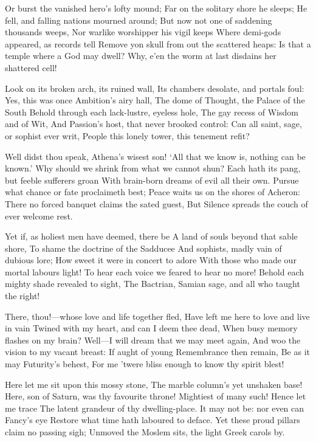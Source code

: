 \documentclass[10pt,twocolumn]{book}
\begin{document}
   Or burst the vanished hero's lofty mound;
   Far on the solitary shore he sleeps;
   He fell, and falling nations mourned around;
   But now not one of saddening thousands weeps,
   Nor warlike worshipper his vigil keeps
   Where demi-gods appeared, as records tell
   Remove yon skull from out the scattered heaps:
   Is that a temple where a God may dwell?
Why, e'en the worm at last disdains her shattered cell!


   Look on its broken arch, its ruined wall,
   Its chambers desolate, and portals foul:
   Yes, this was once Ambition's airy hall,
   The dome of Thought, the Palace of the South
   Behold through each lack-lustre, eyeless hole,
   The gay recess of Wisdom and of Wit,
   And Passion's host, that never brooked control:
   Can all saint, sage, or sophist ever writ,
People this lonely tower, this tenement refit?


   Well didst thou speak, Athena's wisest son!
   `All that we know is, nothing can be known.'
   Why should we shrink from what we cannot shun?
   Each hath its pang, but feeble sufferers groan
   With brain-born dreams of evil all their own.
   Pursue what chance or fate proclaimeth best;
   Peace waits us on the shores of Acheron:
   There no forced banquet claims the sated guest,
But Silence spreads the couch of ever welcome rest.


   Yet if, as holiest men have deemed, there be
   A land of souls beyond that sable shore,
   To shame the doctrine of the Sadducee
   And sophists, madly vain of dubious lore;
   How sweet it were in concert to adore
   With those who made our mortal labours light!
   To hear each voice we feared to hear no more!
   Behold each mighty shade revealed to sight,
The Bactrian, Samian sage, and all who taught the right!


   There, thou!---whose love and life together fled,
   Have left me here to love and live in vain\textemdash
   Twined with my heart, and can I deem thee dead,
   When busy memory flashes on my brain?
   Well---I will dream that we may meet again,
   And woo the vision to my vacant breast:
   If aught of young Remembrance then remain,
   Be as it may Futurity's behest,
For me 'twere bliss enough to know thy spirit blest!


   Here let me sit upon this mossy stone,
   The marble column's yet unshaken base!
   Here, son of Saturn, was thy favourite throne!
   Mightiest of many such!  Hence let me trace
   The latent grandeur of thy dwelling-place.
   It may not be:  nor even can Fancy's eye
   Restore what time hath laboured to deface.
   Yet these proud pillars claim no passing sigh;
Unmoved the Moslem sits, the light Greek carols by.
\end{document}
